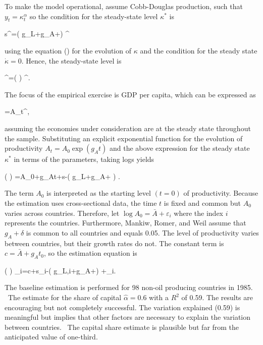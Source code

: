 ﻿\documentclass[oneside]{book}
\begin{document}
To make the model operational, assume Cobb-Douglas production, such that $y_{t}=\kappa _{t}^{\alpha }$ so the condition for the steady-state level $\kappa ^{\ast }$ is



s\kappa ^{\ast \alpha }=( g_{L}+g_{A}+\delta ) \kappa ^{\ast }


using the equation () for the evolution of $\kappa $ and the
condition for the steady state $\dot{\kappa}=0$. Hence, the steady-state
level is



\kappa ^{\ast }=( ) ^{}.


The focus of the empirical exercise is GDP per capita, which can be
expressed as



=A_{t}\kappa ^{\ast \alpha },


assuming the economies under consideration are at the steady state
throughout the sample. Substituting an explicit exponential function for
the evolution of productivity $A_{t}=A_{0}\exp ( g_{A}t)$ and
the above expression for the steady state $\kappa ^{\ast }$ in terms of the
parameters, taking logs yields



\log ( ) =\log A_{0}+g_{A}t+\log s-\log ( g_{L}+g_{A}+\delta
) .


The term $A_{0}$ is interpreted as the starting level $( t=0) $
of productivity. Because the estimation uses cross-sectional data, the time $t$ is fixed and common but $A_{0}$ varies across countries. Therefore, let
$\log A_{0}=\bar{A}+\varepsilon _{i}$ where the index $i$ represents the
countries. Furthermore, Mankiw, Romer, and Weil  assume that $g_{A}+\delta $ is common to all
countries and equals 0.05. The level of productivity varies between
countries, but their growth rates do not. The constant term is $c=\bar{A}+g_{A}t_{0}$, so the estimation equation is



\log ( ) _{i}=c+\log s_{i}-\log ( g_{L,i}+g_{A}+\delta )
+\varepsilon _{i}.


The baseline estimation is performed for 98 non-oil producing countries in 1985.
\ The estimate for the share of capital $\widehat{\alpha }=0.6$ with a $R^{2} $ of 0.59. The results are encouraging but not completely
successful. The variation explained (0.59) is meaningful but implies that
other factors are necessary to explain the variation between countries. \
The capital share estimate is plausible but far from the anticipated value
of one-third.
\end{document}
